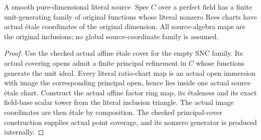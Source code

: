 \begin{theorem}\label{thm:sc0-smooth-source-unit-rees-etale-cover}
\leanok
{}
A smooth pure-dimensional literal source $\operatorname{Spec}C$ over a
perfect field has a finite unit-generating family of original functions
whose literal nonzero Rees charts have actual \'etale coordinates of the
original dimension. All source-algebra maps are the original inclusions;
no global source-coordinate family is assumed.
\end{theorem}
\begin{proof}
Use the checked actual affine \'etale cover for the empty SNC family. Its
actual covering opens admit a finite principal refinement in $C$ whose
functions generate the unit ideal. Every literal ratio-chart map is an
actual open immersion with image the corresponding principal open, hence
lies inside one actual source \'etale chart. Construct the actual affine
factor ring map, its \'etaleness and its exact field-base scalar tower from
the literal inclusion triangle. The actual image coordinates are then
\'etale by composition. The checked principal-cover construction supplies
actual point coverage, and its nonzero generator is produced internally.
\end{proof}
